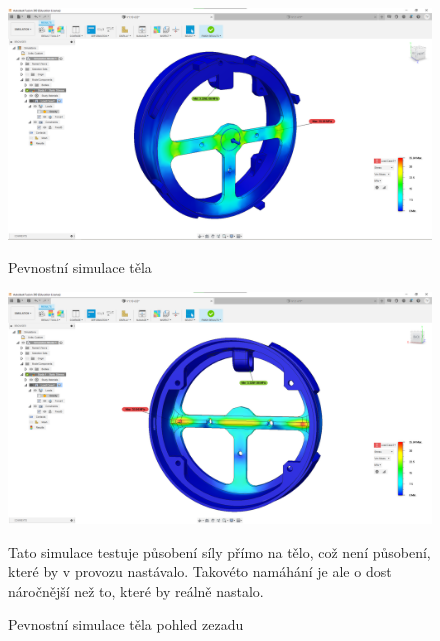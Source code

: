 \begin{figure}[htbp]
    \centering
    \includegraphics[width=370pt]{kapitoly/obrazky/E4/machanika_tlakove_desky/simulace/F100N,primo,uprostred,pohled_zepredu.png}
    \caption{Pevnostní simulace těla}
    \includegraphics[width=370pt]{kapitoly/obrazky/E4/machanika_tlakove_desky/simulace/F100N,primo,uprostred,pohled_zezadu.png}
    \caption{Pevnostní simulace těla pohled zezadu}
    Tato simulace testuje působení síly přímo na tělo, což není působení, které by v provozu nastávalo. Takovéto namáhání je ale o dost náročnější
    než to, které by reálně nastalo.
    \label{fig:E4-simulace_tela} %
\end{figure}

